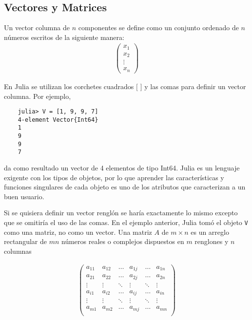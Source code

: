\subsection{Vectores y Matrices}

Un vector columna de $n$ componentes se define como un conjunto ordenado de $n$ números escritos de la siguiente manera:
\begin{equation*}
    \begin{aligned}
    \begin{pmatrix}
    x_1 \\ 
    x_2 \\
    \vdots \\
    x_n
    \end{pmatrix} 
    \end{aligned}
\end{equation*}

En \textsf{Julia} se utilizan los corchetes cuadrados $[$ $]$ y las comas para definir un vector columna. Por ejemplo, 

\begin{verbatim}
	julia> V = [1, 9, 9, 7]
	4-element Vector{Int64}
	1
	9
	9
	7
\end{verbatim}

\noindent da como resultado un vector de 4 elementos de tipo Int64. \textsf{Julia} es un lenguaje exigente con los tipos de objetos, por lo que aprender las características y funciones singulares de cada objeto es uno de los atributos que caracterizan a un buen usuario. 

Si se quisiera definir un vector renglón se haría exactamente lo mismo excepto que se omitiría el uso de las comas. En el ejemplo anterior, \textsf{Julia} tomó el objeto \texttt{V} como una matriz, no como un vector. Una matriz $A$ de $m \times n$ es un arreglo rectangular de $mn$ números reales o complejos dispuestos en $m$ renglones y $n$ columnas 

\begin{equation*}
    \begin{aligned}
    \begin{pmatrix}
    a_{11} & a_{12} & \dots & a_{1j} & \dots & a_{1n} \\
    a_{21} & a_{22} & \dots & a_{2j} & \dots & a_{2n} \\
    \vdots &  \vdots  &  \ddots &  \vdots  & \ddots &\vdots\\
    a_{i1} & a_{i2} & \dots & a_{ij} & \dots & a_{in} \\
    \vdots &  \vdots  &  \ddots &  \vdots  & \ddots &\vdots\\
     a_{m1} & a_{m2} & \dots & a_{mj} & \dots & a_{mn} \\
    \end{pmatrix} 
    \end{aligned}
\end{equation*}


